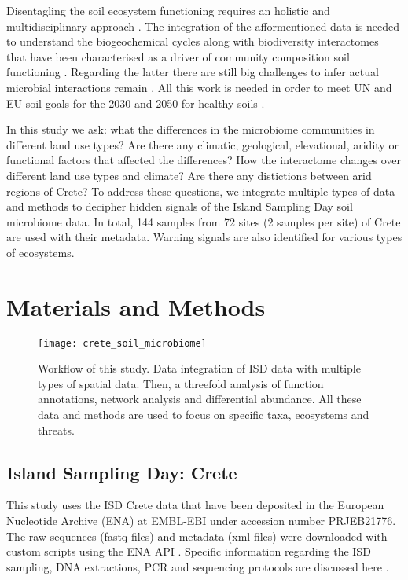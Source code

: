 Disentagling the soil ecosystem functioning requires an holistic and 
multidisciplinary approach \parencite{vogel2022}. The integration of the afformentioned
data is needed to understand the biogeochemical cycles along with biodiversity interactomes 
that have been characterised as a driver of community composition soil
functioning \parencite{GUSEVA2022108604}.
Regarding the latter there are still big challenges to infer actual microbial
interactions remain \parencite{Faust2021}. All this work is needed in order to meet
UN and EU soil goals for the 2030 and 2050 for healthy soils \parencite{LAL2021e00398}.

In this study we ask: what the differences in the microbiome communities in different land use types?
Are there any climatic, geological, elevational, aridity or functional factors that affected the differences?
How the interactome changes over different land use types and climate?
Are there any distictions between arid regions of Crete?
To address these questions, we integrate multiple types of data and methods to decipher hidden 
signals of the Island Sampling Day soil microbiome data. In total, 144 samples from
72 sites (2 samples per site) of Crete are used with their metadata.
Warning signals are also identified for various types of ecosystems.


\section{Materials and Methods}\label{methods}

\begin{figure}[t] 
    \centering\texttt{[image: crete\_soil\_microbiome]}
    \caption{Workflow of this study. Data integration of ISD data with multiple types of spatial data. Then, a threefold analysis of function annotations, network analysis and differential abundance. All these data and methods are used to focus on specific taxa, ecosystems and threats.}
    \label{fig:workflow}
\end{figure}

\subsection{Island Sampling Day: Crete}\label{isd_data}

This study uses the ISD Crete data that have been deposited
in the European Nucleotide Archive (ENA) at EMBL-EBI under accession number PRJEB21776.
The raw sequences (fastq files) and metadata (xml files) were downloaded with custom scripts using the ENA API \parencite{Yuan2023}.
Specific information regarding the ISD sampling, DNA extractions, PCR and sequencing
protocols are discussed here \parencite{holm2024}.

